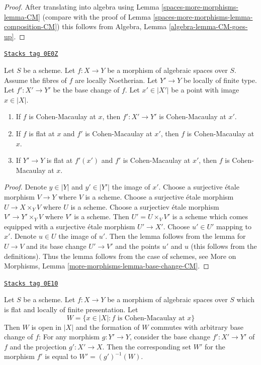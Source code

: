 \begin{proof}
After translating into algebra using Lemma \ref{spaces-more-morphisms-lemma-CM}
(compare with the proof of
Lemma \ref{spaces-more-morphisms-lemma-composition-CM}) this follows from
Algebra, Lemma \ref{algebra-lemma-CM-goes-up}.
\end{proof}

\begin{lemma}
\label{spaces-more-morphisms-lemma-base-change-CM}
\href{https://stacks.math.columbia.edu/tag/0E0Z}{\texttt{Stacks tag 0E0Z}}

Let $S$ be a scheme.
Let $f : X \to Y$ be a morphism of algebraic spaces over $S$.
Assume the fibres of $f$ are locally Noetherian.
Let $Y' \to Y$ be locally of finite type. Let $f' : X' \to Y'$
be the base change of $f$.
Let $x' \in |X'|$ be a point with image $x \in |X|$.
\begin{enumerate}
\item If $f$ is Cohen-Macaulay at $x$, then
$f' : X' \to Y'$ is Cohen-Macaulay at $x'$.
\item If $f$ is flat at $x$ and $f'$ is Cohen-Macaulay at $x'$, then $f$
is Cohen-Macaulay at $x$.
\item If $Y' \to Y$ is flat at $f'(x')$ and $f'$ is Cohen-Macaulay at
$x'$, then $f$ is Cohen-Macaulay at $x$.
\end{enumerate}
\end{lemma}

\begin{proof}
Denote $y \in |Y|$ and $y' \in |Y'|$ the image of $x'$.
Choose a surjective \'etale morphism $V \to Y$ where $V$ is a scheme.
Choose a surjective \'etale morphism $U \to X \times_Y V$ where
$U$ is a scheme.
Choose a surjectiev \'etale morphism $V' \to Y' \times_Y V$
where $V'$ is a scheme.
Then $U' = U \times_V V'$ is a scheme which comes equipped
with a surjective \'etale morphism $U' \to X'$.
Choose $u' \in U'$ mapping to $x'$. Denote $u \in U$ the image of $u'$.
Then the lemma follows from the lemma for
$U \to V$ and its base change $U' \to V'$ and the
points $u'$ and $u$ (this follows from the definitions).
Thus the lemma follows from the case of schemes, see
More on Morphisms, Lemma \ref{more-morphisms-lemma-base-change-CM}.
\end{proof}

\begin{lemma}
\label{spaces-more-morphisms-lemma-flat-finite-presentation-CM-open}
\href{https://stacks.math.columbia.edu/tag/0E10}{\texttt{Stacks tag 0E10}}

Let $S$ be a scheme.
Let $f : X \to Y$ be a morphism of algebraic spaces over $S$
which is flat and locally of finite presentation. Let
$$
W = \{x \in |X| : f\text{ is Cohen-Macaulay at }x\}
$$
Then $W$ is open in $|X|$ and the formation of $W$
commutes with arbitrary base change of $f$:
For any morphism $g : Y' \to Y$, consider
the base change $f' : X' \to Y'$ of $f$ and the
projection $g' : X' \to X$. Then the corresponding
set $W'$ for the morphism $f'$ is equal to $W' = (g')^{-1}(W)$.
\end{lemma}

